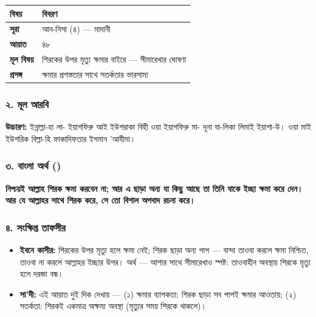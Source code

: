 \begin{table}[h]\centering\small
\begin{tabular}{ll}
বিষয় & বিবরণ \\
\hline
\textbf{সূরা} & আন-নিসা (৪) — মাদানী \\
\textbf{আয়াত} & ৪৮ \\
\textbf{মূল বিষয়} & শিরকের উপর মৃত্যু ক্ষমার বাইরে — সীমারেখার ঘোষণা \\
\textbf{প্রসঙ্গ} & ক্ষমার প্রশস্ততার সাথে সতর্কতার ভারসাম্য \\
\hline
\end{tabular}
\end{table}

\subsubsection*{২. মূল আরবি}

\begin{center}\end{center}
\textbf{উচ্চারণ:} ইন্নাল্লা-হা লা- ইয়াগফিরু আই ইউশরাকা বিহী ওয়া ইয়াগফিরু মা- দূনা যা-লিকা লিমাই ইয়াশা-উ। ওয়া মাই ইউশরিক বিল্লা-হি ফাকাদিফতার ইসমান 'আযীমা।

\subsubsection*{৩. বাংলা অর্থ ()}

\textbf{নিশ্চয়ই আল্লাহ শিরক ক্ষমা করবেন না; আর এ ছাড়া অন্য যা কিছু আছে তা তিনি যাকে ইচ্ছা ক্ষমা করে দেন। আর যে আল্লাহর সাথে শিরক করে, সে তো বিশাল অপবাদ রচনা করে।}

\subsubsection*{৪. সংক্ষিপ্ত তাফসীর}

\begin{itemize}
\item \textbf{ইবনে কাসীর:} শিরকের উপর মৃত্যু হলে ক্ষমা নেই; শিরক ছাড়া অন্য পাপ — বান্দা তাওবা করলে ক্ষমা নিশ্চিত, তাওবা না করলে আল্লাহর ইচ্ছার উপর। অর্থ — আশার সাথে সীমারেখাও স্পষ্ট: তাওবাহীন অবস্থায় শিরকে মৃত্যু হলে দরজা বন্ধ।
\item \textbf{সা'দী:} এই আয়াত দুই দিক দেখায় — (১) ক্ষমার ব্যাপকতা: শিরক ছাড়া সব পাপই ক্ষমার আওতায়; (২) সতর্কতা: শিরকই একমাত্র অক্ষম্য অবস্থা (মৃত্যুর সময় শিরকে থাকলে)।
\end{itemize}
